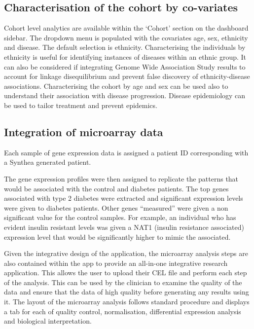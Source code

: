 \documentclass{bioinfo}
\begin{document}
\subsection{Characterisation of the cohort by co-variates}
Cohort level analytics are available within the `Cohort' section on the dashboard sidebar. The dropdown menu is populated with the covariates age, sex, ethnicity and disease. The default selection is ethnicity. Characterising the individuals by ethnicity is useful for identifying instances of diseases within an ethnic group. It can also be considered if integrating Genome Wide Association Study results to account for linkage disequilibrium and prevent false discovery of ethnicity-disease associations. Characterising the cohort by age and sex can be used also to understand their association with disease progression. Disease epidemiology can be used to tailor treatment and prevent epidemics.


\subsection{Integration of microarray data}

Each sample of gene expression data is assigned a patient ID corresponding with a Synthea generated patient. 

The gene expression profiles were then assigned to replicate the patterns that would be associated with the control and diabetes patients. The top genes associated with type 2 diabetes were extracted and significant expression levels were given to diabetes patients. Other genes “measured” were given a non significant value for the control samples. For example, an individual who has evident insulin resistant levels was given a NAT1 (insulin resistance associated) expression level that would be significantly higher to mimic the associated. 


Given the integrative design of the application, the microarray analysis steps are also contained within the app to provide an all-in-one integrative research application. This allows the user to upload their CEL file and perform each step of the analysis. This can be used by the clinician to examine the quality of the data and ensure that the data of high quality before generating any results using it. The layout of the microarray analysis follows standard procedure and displays a tab for each of quality control, normalisation, differential expression analysis and biological interpretation. 
\end{document}
